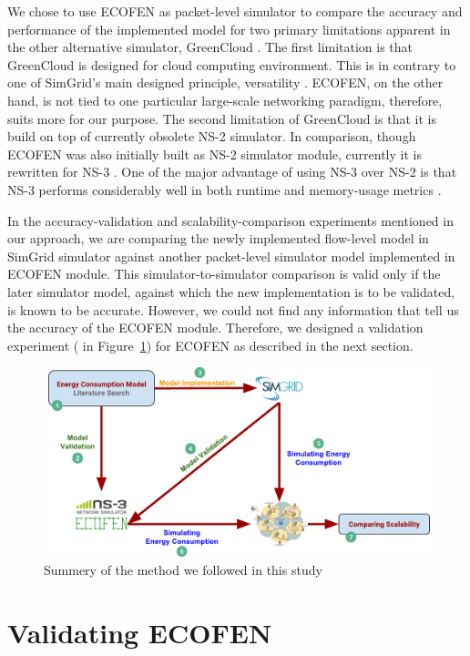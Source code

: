 We chose to use ECOFEN as packet-level simulator to compare the accuracy and performance of the implemented model for two primary limitations apparent in the other alternative simulator, GreenCloud \cite{DBLP:journals/tjs/KliazovichBK12}. The first limitation is that GreenCloud is designed for cloud computing environment. This is in contrary to one of SimGrid's main designed principle, versatility \cite{DBLP:journals/jpdc/CasanovaGLQS14}. ECOFEN, on the other hand, is not tied to one particular large-scale networking paradigm, therefore, suits more for our purpose. The second limitation of GreenCloud is that it is build on top of currently obsolete NS-2 simulator. In comparison, though ECOFEN was also initially built as NS-2 simulator module, currently it is rewritten for NS-3 \cite{DBLP:conf/cloudnet/CorneaOL14}. One of the major advantage of using NS-3 over NS-2 is that NS-3 performs considerably well in both runtime and memory-usage metrics \cite{DBLP:conf/icc/WeingartnerLW09}.

In the accuracy-validation and scalability-comparison experiments mentioned in our approach, we are comparing the newly implemented flow-level model in SimGrid simulator against another packet-level simulator model implemented in ECOFEN module. This simulator-to-simulator comparison is valid only if the later simulator model, against which the new implementation is to be validated, is known to be accurate. However, we could not find any information that tell us the accuracy of the ECOFEN module. Therefore, we designed a validation experiment ( in Figure~\ref{fig:approach}) for ECOFEN as described in the next section. 

\begin{figure}[ht]
	\begin{center}
		\includegraphics{images/approach.pdf}
		\caption{Summery of the method we followed in this study}
		\label{fig:approach}
	\end{center}
\end{figure}
\section{Validating ECOFEN}
 